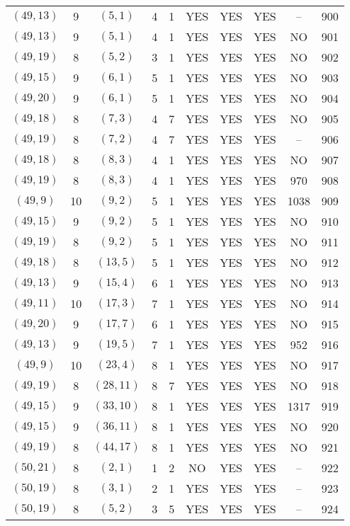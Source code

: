 \begin{longtable}{|c|c|c|c|c|c|c|c|c|c|}
$(49, 13)$ & 9 & $(5, 1)$ & 4 & 1 & YES & YES & YES & -- & 900\\
$(49, 13)$ & 9 & $(5, 1)$ & 4 & 1 & YES & YES & YES & NO & 901\\
$(49, 19)$ & 8 & $(5, 2)$ & 3 & 1 & YES & YES & YES & NO & 902\\
$(49, 15)$ & 9 & $(6, 1)$ & 5 & 1 & YES & YES & YES & NO & 903\\
$(49, 20)$ & 9 & $(6, 1)$ & 5 & 1 & YES & YES & YES & NO & 904\\
$(49, 18)$ & 8 & $(7, 3)$ & 4 & 7 & YES & YES & YES & NO & 905\\
$(49, 19)$ & 8 & $(7, 2)$ & 4 & 7 & YES & YES & YES & -- & 906\\
$(49, 18)$ & 8 & $(8, 3)$ & 4 & 1 & YES & YES & YES & NO & 907\\
$(49, 19)$ & 8 & $(8, 3)$ & 4 & 1 & YES & YES & YES & 970 & 908\\
$(49, 9)$ & 10 & $(9, 2)$ & 5 & 1 & YES & YES & YES & 1038 & 909\\
$(49, 15)$ & 9 & $(9, 2)$ & 5 & 1 & YES & YES & YES & NO & 910\\
$(49, 19)$ & 8 & $(9, 2)$ & 5 & 1 & YES & YES & YES & NO & 911\\
$(49, 18)$ & 8 & $(13, 5)$ & 5 & 1 & YES & YES & YES & NO & 912\\
$(49, 13)$ & 9 & $(15, 4)$ & 6 & 1 & YES & YES & YES & NO & 913\\
$(49, 11)$ & 10 & $(17, 3)$ & 7 & 1 & YES & YES & YES & NO & 914\\
$(49, 20)$ & 9 & $(17, 7)$ & 6 & 1 & YES & YES & YES & NO & 915\\
$(49, 13)$ & 9 & $(19, 5)$ & 7 & 1 & YES & YES & YES & 952 & 916\\
$(49, 9)$ & 10 & $(23, 4)$ & 8 & 1 & YES & YES & YES & NO & 917\\
$(49, 19)$ & 8 & $(28, 11)$ & 8 & 7 & YES & YES & YES & NO & 918\\
$(49, 15)$ & 9 & $(33, 10)$ & 8 & 1 & YES & YES & YES & 1317 & 919\\
$(49, 15)$ & 9 & $(36, 11)$ & 8 & 1 & YES & YES & YES & NO & 920\\
$(49, 19)$ & 8 & $(44, 17)$ & 8 & 1 & YES & YES & YES & NO & 921\\
$(50, 21)$ & 8 & $(2, 1)$ & 1 & 2 & NO & YES & YES & -- & 922\\
$(50, 19)$ & 8 & $(3, 1)$ & 2 & 1 & YES & YES & YES & -- & 923\\
$(50, 19)$ & 8 & $(5, 2)$ & 3 & 5 & YES & YES & YES & -- & 924\\

\end{longtable}
